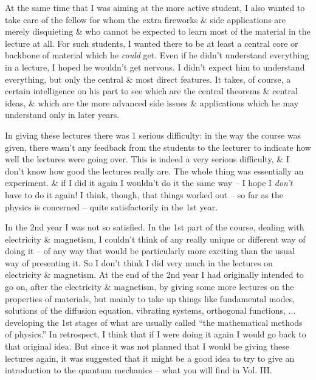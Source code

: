 \documentclass{article}
\begin{document}
At the same time that I was aiming at the more active student, I also wanted to take care of the fellow for whom the extra fireworks \& side applications are merely disquieting \& who cannot be expected to learn most of the material in the lecture at all. For such students, I wanted there to be at least a central core or backbone of material which he {\it could} get. Even if he didn't understand everything in a lecture, I hoped he wouldn't get nervous. I didn't expect him to understand everything, but only the central \& most direct features. It takes, of course, a certain intelligence on his part to see which are the central theorems \& central ideas, \& which are the more advanced side issues \& applications which he may understand only in later years.

In giving these lectures there was 1 serious difficulty: in the way the course was given, there wasn't any feedback from the students to the lecturer to indicate how well the lectures were going over. This is indeed a very serious difficulty, \& I don't know how good the lectures really are. The whole thing was essentially an experiment. \& if I did it again I wouldn't do it the same way -- I hope I {\it don't} have to do it again! I think, though, that things worked out -- so far as the physics is concerned -- quite satisfactorily in the 1st year.

In the 2nd year I was not so satisfied. In the 1st part of the course, dealing with electricity \& magnetism, I couldn't think of any really unique or different way of doing it -- of any way that would be particularly more exciting than the usual way of presenting it. So I don't think I did very much in the lectures on electricity \& magnetism. At the end of the 2nd year I had originally intended to go on, after the electricity \& magnetism, by giving some more lectures on the properties of materials, but mainly to take up things like fundamental modes, solutions of the diffusion equation, vibrating systems, orthogonal functions, $\ldots$ developing the 1st stages of what are usually called ``the mathematical methods of physics.'' In retrospect, I think that if I were doing it again I would go back to that original idea. But since it was not planned that I would be giving these lectures again, it was suggested that it might be a good idea to try to give an introduction to the quantum mechanics -- what you will find in Vol. III.
\end{document}
